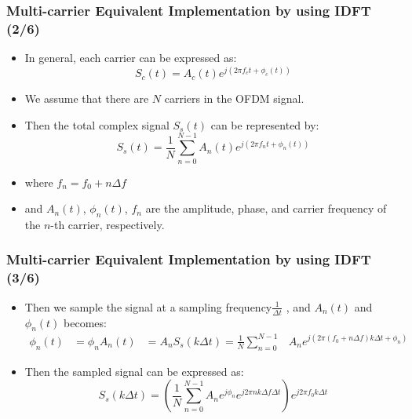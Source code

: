 \documentclass[xcolor=dvipsnames]{beamer} %
\def\\{}%
\begin{document}
\begin{frame}
    \frametitle{Multi-carrier Equivalent Implementation by using IDFT (2/6)}
    \begin{itemize}
        \item In general, each carrier can be expressed as:
        \begin{equation}
            S_{c}(t)=A_{c}(t)e^{j(2\pi f_{c}t+\phi_{c}(t))}   
        \end{equation}
        \item We assume that there are \(N\) carriers in the OFDM signal.
        \item Then the total complex signal \(S_{s}(t)\) can be represented by:
        \begin{equation}
            S_{s}(t)=\frac{1}{N}\sum_{n=0}^{N-1}A_{n}(t)e^{j(2\pi f_{n}t+\phi_{n}(t))}
        \end{equation}
        \item where \( f_{n}=f_{0}+n\Delta f \) \\
        \item and \(A_{n}(t)\), \(\phi_{n}(t)\), \(f_{n}\) are the amplitude, phase, and carrier frequency of the \(n\)-th carrier, respectively.
    \end{itemize}
\end{frame}
\begin{frame}
    \frametitle{Multi-carrier Equivalent Implementation by using IDFT (3/6)}
    \begin{itemize}
        \item  Then we sample the signal at a sampling frequency$\frac{1}{\Delta t}$ , and $A_{n}(t)$ and $\phi_{n}(t)$ becomes:
        \begin{align}
            \phi_{n}(t)&=\phi_{n}\\
            A_{n}(t)&=A_{n}\\
            S_{s}(k\Delta t)=\frac{1}{N}\sum_{n=0}^{N-1}&A_{n}e^{j(2\pi(f_{0}+n\Delta f)k\Delta t+\phi_{n})}
        \end{align}
    \end{itemize}
    \begin{itemize}
        \item Then the sampled signal can be expressed as:
        \begin{equation}
            S_{s}(k\Delta t)=(\frac{1}{N}\sum_{n=0}^{N-1}A_{n}e^{j\phi_{n}}e^{j2\pi nk\Delta f\Delta t})e^{j2\pi f_{0}k\Delta t}       
        \end{equation}
    \end{itemize}
\end{frame}
\end{document}
